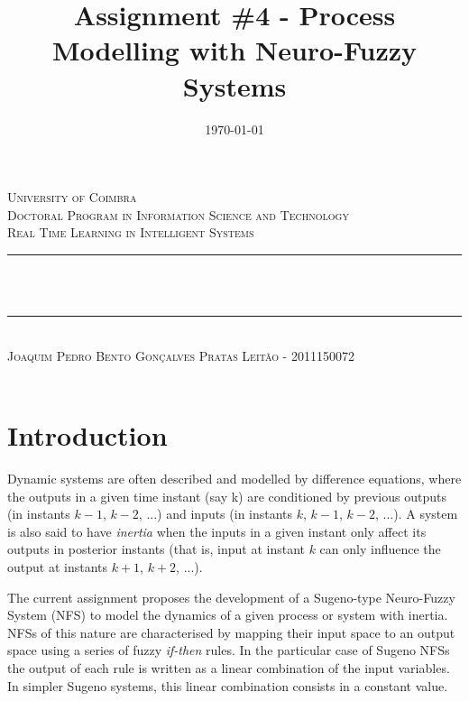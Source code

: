 \documentclass[11pt]{article}
\title{Assignment \#4 - Process Modelling with Neuro-Fuzzy Systems}
\date{\today}
\makeatletter
\let\thetitle\@title
\let\thedate\@date
\makeatother
\begin{document}

\begin{titlepage}
	\centering
    \textsc{\LARGE University of Coimbra}\\[1.0 cm]
	\textsc{\large Doctoral Program in Information Science and Technology}\\[0.5 cm]
    \textsc{\large Real Time Learning in Intelligent Systems}\\[5 cm]
	\rule{\linewidth}{0.2 mm} \\[0.4 cm]
	{ \LARGE \bfseries \thetitle}\\ [0.2 cm]
    \rule{\linewidth}{0.2 mm} \\[3 cm]
    
    \textsc{Joaquim Pedro Bento Gonçalves Pratas Leitão - 2011150072}\\[5 cm]
	
	{\large \thedate}\\[2 cm]
 
	\vfill
	
\end{titlepage}


\section{Introduction}
\label{introduction}

Dynamic systems are often described and modelled by difference equations, where the outputs in a given time instant (say k) are conditioned by previous outputs (in instants $k-1$, $k-2$, ...) and inputs (in instants $k$, $k-1$, $k-2$, ...). A system is also said to have \emph{inertia} when the inputs in a given instant only affect its outputs in posterior instants (that is, input at instant $k$ can only influence the output at instants $k+1$, $k+2$, ...).

The current assignment proposes the development of a Sugeno-type Neuro-Fuzzy System (NFS) to model the dynamics of a given process or system with inertia. NFSs of this nature are characterised by mapping their input space to an output space using a series of fuzzy \emph{if-then} rules. In the particular case of Sugeno NFSs the output of each rule is written as a linear combination of the input variables. In simpler Sugeno systems, this linear combination consists in a constant value.
\end{document}

